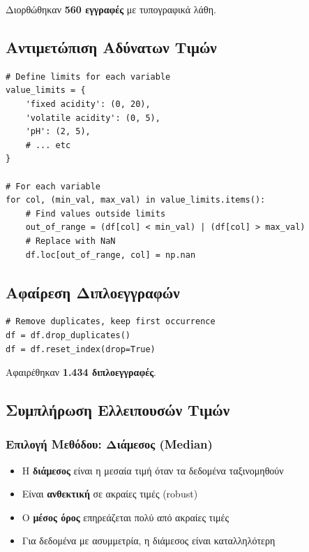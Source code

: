\documentclass[12pt,a4paper]{article}
\begin{document}
\begin{successbox}
\textgreek{Διορθώθηκαν} \textbf{560 \textgreek{εγγραφές}} \textgreek{με τυπογραφικά λάθη.}
\end{successbox}

\subsection{\textgreek{Αντιμετώπιση Αδύνατων Τιμών}}

\begin{lstlisting}[caption={Replace impossible values}]
# Define limits for each variable
value_limits = {
    'fixed acidity': (0, 20),
    'volatile acidity': (0, 5),
    'pH': (2, 5),
    # ... etc
}

# For each variable
for col, (min_val, max_val) in value_limits.items():
    # Find values outside limits
    out_of_range = (df[col] < min_val) | (df[col] > max_val)
    # Replace with NaN
    df.loc[out_of_range, col] = np.nan
\end{lstlisting}

\subsection{\textgreek{Αφαίρεση Διπλοεγγραφών}}

\begin{lstlisting}[caption={Remove duplicates}]
# Remove duplicates, keep first occurrence
df = df.drop_duplicates()
df = df.reset_index(drop=True)
\end{lstlisting}

\begin{successbox}
\textgreek{Αφαιρέθηκαν} \textbf{1.434 \textgreek{διπλοεγγραφές}}.
\end{successbox}

\subsection{\textgreek{Συμπλήρωση Ελλειπουσών Τιμών}}

\subsubsection{\textgreek{Επιλογή Μεθόδου: Διάμεσος (Median)}}

\begin{infobox}
\begin{itemize}
    \item \textgreek{Η} \textbf{\textgreek{διάμεσος}} \textgreek{είναι η μεσαία τιμή όταν τα δεδομένα ταξινομηθούν}
    \item \textgreek{Είναι} \textbf{\textgreek{ανθεκτική}} \textgreek{σε ακραίες τιμές (robust)}
    \item \textgreek{Ο} \textbf{\textgreek{μέσος όρος}} \textgreek{επηρεάζεται πολύ από ακραίες τιμές}
    \item \textgreek{Για δεδομένα με ασυμμετρία, η διάμεσος είναι καταλληλότερη}
\end{itemize}
\end{infobox}
\end{document}
